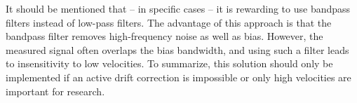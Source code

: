 It should be mentioned that -- in specific cases -- it is rewarding to use bandpass filters instead of low-pass filters. The advantage of this approach is that the bandpass filter removes high-frequency noise as well as bias. However, the measured signal often overlaps the bias bandwidth, and using such a filter leads to insensitivity to low velocities. To summarize, this solution should only be implemented if an active drift correction is impossible or only high velocities are important for research.


